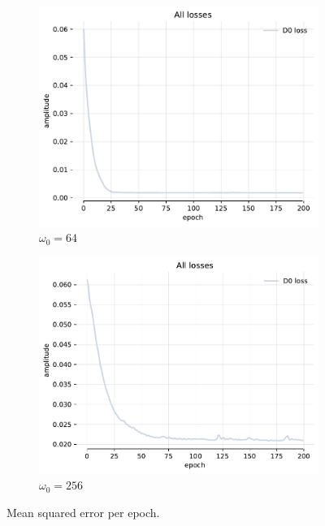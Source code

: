 \begin{figure}[h]
    \centering
    \begin{subfigure}[b]{0.45\textwidth}
        \centering
        \includegraphics[width=\textwidth]{img/ch3/loss-noise-hl0-hf512-w64.pdf}
        \caption{$\omega_0=64$}
        \label{fig:loss-hf512-w64}
    \end{subfigure}
    \begin{subfigure}[b]{0.45\textwidth}
        \centering
        \includegraphics[width=\textwidth]{img/ch3/loss-noise-hl0-hf512-w256.pdf}
        \caption{$\omega_0=256$}
        \label{fig:loss-hf512-w256}
    \end{subfigure}
    \caption{Mean squared error per epoch.}
    \label{f:loss-noise-comparison-hl0-hf512}
\end{figure}


